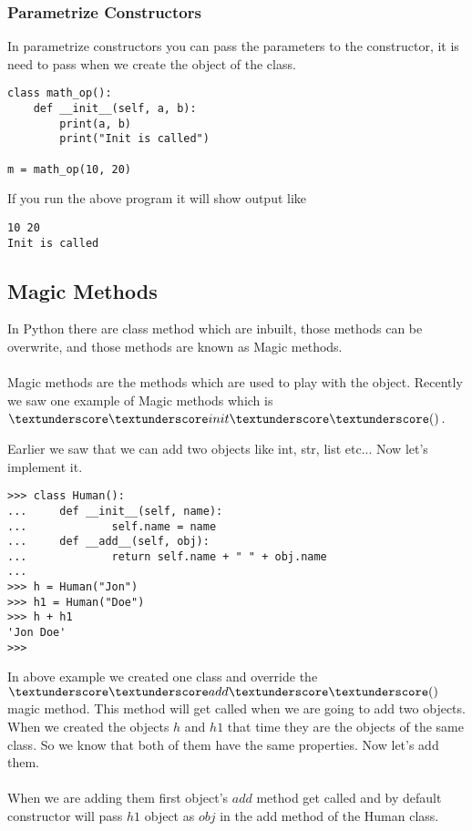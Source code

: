 \documentclass[letterpaper,12pt]{book}
\begin{document}
\subsubsection{Parametrize Constructors}
In parametrize constructors you can pass the parameters to the constructor, it is need to pass when we create the object of the class.

\begin{lstlisting}
class math_op():
    def __init__(self, a, b):
        print(a, b)
        print("Init is called")
		
m = math_op(10, 20)
\end{lstlisting}
If you run the above program it will show output like
\begin{lstlisting}
10 20
Init is called
\end{lstlisting}
\subsection{Magic Methods}
In Python there are class method which are inbuilt, those methods can be overwrite, and those methods are known as Magic methods.
\paragraph{}
Magic methods are the methods which are used to play with the object. Recently we saw one example of Magic methods which is $\textunderscore\textunderscore init \textunderscore\textunderscore()$.

Earlier we saw that we can add two objects like int, str, list etc... Now let's implement it.
\begin{lstlisting}
>>> class Human():
...     def __init__(self, name):
...             self.name = name
...     def __add__(self, obj):
...             return self.name + " " + obj.name
... 
>>> h = Human("Jon")
>>> h1 = Human("Doe")
>>> h + h1
'Jon Doe'
>>> 
\end{lstlisting}
In above example we created one class and override the $\textunderscore\textunderscore add \textunderscore\textunderscore()$ magic method. This method will get called when we are going to add two objects. When we created the objects $h$ and $h1$ that time they are the objects of the same class. So we know that both of them have the same properties. Now let's add them.

\paragraph{}
When we are adding them first object's $add$ method get called and by default constructor will pass $h1$ object as $obj$ in the add method of the Human class.
\end{document}
